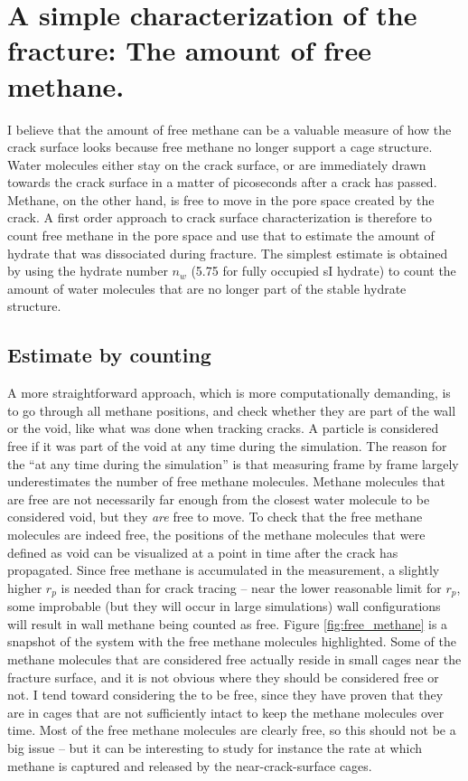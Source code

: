 \section{A simple characterization of the fracture: The amount of free methane.}
I believe that the amount of free methane can be a valuable measure of how the crack surface looks because free methane no longer support a cage structure. Water molecules either stay on the crack surface, or are immediately drawn towards the crack surface in a matter of picoseconds after a crack has passed. Methane, on the other hand, is free to move in the pore space created by the crack. A first order approach to crack surface characterization is therefore to count free methane in the pore space and use that to estimate the amount of hydrate that was dissociated during fracture. The simplest estimate is obtained by using the hydrate number $n_w$ (5.75 for fully occupied sI hydrate) to count the amount of water molecules that are no longer part of the stable hydrate structure. 


\subsection{Estimate by counting}
\label{sec:freemethane_counting}
A more straightforward approach, which is more computationally demanding, is to go through all methane positions, and check whether they are part of the wall or the void, like what was done when tracking cracks. A particle is considered free if it was part of the void at any time during the simulation. The reason for the ``at any time during the simulation'' is that measuring frame by frame largely underestimates the number of free methane molecules. Methane molecules that are free are not necessarily far enough from the closest water molecule to be considered void, but they \emph{are} free to move. To check that the free methane molecules are indeed free, the positions of the methane molecules that were defined as void can be visualized at a point in time after the crack has propagated. Since free methane is accumulated in the measurement, a slightly higher $r_p$ is needed than for crack tracing -- near the lower reasonable limit for $r_p$, some improbable (but they will occur in large simulations) wall configurations will result in wall methane being counted as free. Figure \ref{fig:free_methane} is a snapshot of the system with the free methane molecules highlighted. Some of the methane molecules that are considered free actually reside in small cages near the fracture surface, and it is not obvious where they should be considered free or not. I tend toward considering the to be free, since they have proven that they are in cages that are not sufficiently intact to keep the methane molecules over time. Most of the free methane molecules are clearly free, so this should not be a big issue -- but it can be interesting to study for instance the rate at which methane is captured and released by the near-crack-surface cages.

